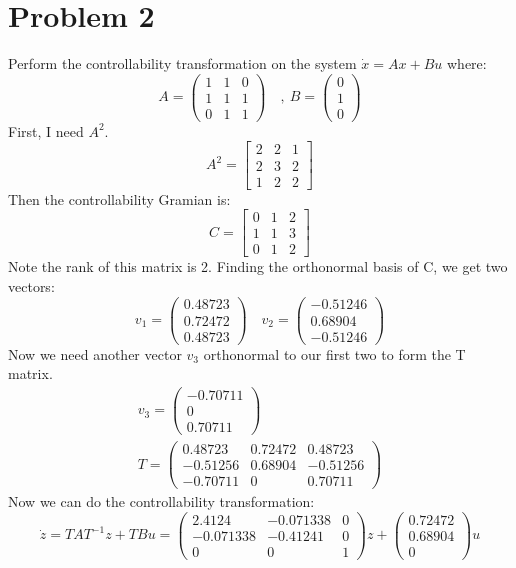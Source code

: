 \documentclass{article}
\begin{document}
\section*{Problem 2}
Perform the controllability transformation on the system $\dot{x}=Ax+Bu$ where:
\[A=\begin{pmatrix}1&1&0\\1&1&1\\0&1&1\end{pmatrix}\quad,\ B=\begin{pmatrix}0\\1\\0\end{pmatrix}\]
First, I need $A^2$.
\[A^2=\begin{bmatrix}2&2&1\\2&3&2\\1&2&2\end{bmatrix}\]
Then the controllability Gramian is:
\[C=\begin{bmatrix}0&1&2\\1&1&3\\0&1&2\end{bmatrix}\]
Note the rank of this matrix is 2. Finding the orthonormal basis of C, we get two vectors:
\[v_1=\begin{pmatrix}0.48723\\0.72472\\0.48723\end{pmatrix}\quad v_2=\begin{pmatrix}-0.51246\\0.68904\\-0.51246\end{pmatrix}\]
Now we need another vector $v_3$ orthonormal to our first two to form the T matrix.\\
\[\begin{array}{c}v_3=\begin{pmatrix}-0.70711\\0\\0.70711\end{pmatrix}\\[2em]T=\begin{pmatrix}0.48723&0.72472&0.48723\\-0.51256&0.68904&-0.51256\\-0.70711&0&0.70711\end{pmatrix}\end{array}\]
Now we can do the controllability transformation:
\[\dot{z}=TAT^{-1}z+TBu=\begin{pmatrix}2.4124&-0.071338&0\\-0.071338&-0.41241&0\\0&0&1\end{pmatrix}z+\begin{pmatrix}0.72472\\0.68904\\0\end{pmatrix}u\]
\end{document}
